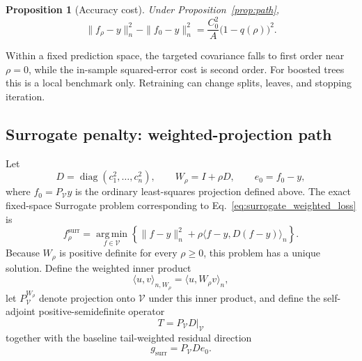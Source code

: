 \documentclass[10pt]{article}
\newtheorem{proposition}{Proposition}
\theoremstyle{definition}
\newcommand{\diag}{\operatorname{diag}}
\newcommand{\1}{\mathbf{1}}
\newcommand{\Vcal}{\mathcal{V}}
\newcommand{\argminop}{\operatorname*{arg\,min}}
\begin{document}
\begin{proposition}[Accuracy cost]
\label{prop:path_cost}
Under Proposition~\ref{prop:path},
\[
\|f_\rho-y\|_n^2-\|f_0-y\|_n^2
=
\frac{C_0^2}{A}\bigl(1-q(\rho)\bigr)^2.
\]
\end{proposition}

Within a fixed prediction space, the targeted covariance falls to first order near $\rho=0$, while the in-sample squared-error cost is second order. For boosted trees this is a local benchmark only. Retraining can change splits, leaves, and stopping iteration.

\subsection{Surrogate penalty: weighted-projection path}

{
Let
\[
D=\diag(c_1^2,\ldots,c_n^2),
\qquad
W_\rho=I+\rho D,
\qquad
e_0=f_0-y,
\]
where $f_0=P_{\Vcal}y$ is the ordinary least-squares projection defined above. The exact fixed-space Surrogate problem corresponding to Eq.~\eqref{eq:surrogate_weighted_loss} is
\begin{equation}
\label{eq:surrogate_fixed_space_problem}
f_\rho^{\mathrm{surr}}
=
\argminop_{f\in\Vcal}
\left\{
\|f-y\|_n^2
+
\rho\langle f-y,D(f-y)\rangle_n
\right\}.
\end{equation}
Because $W_\rho$ is positive definite for every $\rho\geq0$, this problem has a unique solution. Define the weighted inner product
\[
\langle u,v\rangle_{n,W_\rho}
=
\langle u,W_\rho v\rangle_n,
\]
let $P_{\Vcal}^{W_\rho}$ denote projection onto $\Vcal$ under this inner product, and define the self-adjoint positive-semidefinite operator
\[
T=P_{\Vcal}D\big|_{\Vcal}
\]
together with the baseline tail-weighted residual direction
\[
g_{\mathrm{surr}}
=
P_{\Vcal}De_0.
\]}
\end{document}
